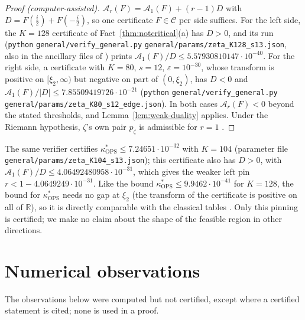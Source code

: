 \documentclass[11pt]{amsart}
\newcommand{\RR}{\mathbb R}
\newcommand{\eps}{\varepsilon}
\newcommand{\xin}[1]{\xi_{#1}}
\newcommand{\Arch}{\mathcal A}
\newcommand{\Cone}{\mathcal C}
\newcommand{\kOPS}{\kappa^{*}_{\mathrm{OPS}}}
\newcommand{\pz}{p_\zeta}
\theoremstyle{definition}
\theoremstyle{remark}
\numberwithin{equation}{section}
\begin{document}
\begin{proof}[Proof \textup{(computer-assisted)}]
$\Arch_r(F)=\Arch_1(F)+(r-1)D$ with $D=F(\frac i2)+F(-\frac i2)$, so one certificate $F\in\Cone$ per side suffices. For the left
side, the $K=128$ certificate of Fact~\ref{thm:notcritical}(a) has $D>0$, and its run (\texttt{python}
\nolinkurl{general/verify_general.py} \nolinkurl{general/params/zeta_K128_s13.json}, also in the ancillary files of \cite{PaperI}) prints
$\Arch_1(F)/D\le5.57930810147\cdot10^{-40}$. For the right side, a certificate with $K=80$, $s=12$, $\eps=10^{-30}$, whose transform is
positive on $[\xin2,\infty)$ but negative on part of $(0,\xin2)$, has $D<0$ and $\Arch_1(F)/\lvert D\rvert\le7.85509419726\cdot10^{-21}$
(\texttt{python} \nolinkurl{general/verify_general.py} \nolinkurl{general/params/zeta_K80_s12_edge.json}). In both cases $\Arch_r(F)<0$ beyond the
stated thresholds, and Lemma~\ref{lem:weak-duality} applies. Under the Riemann hypothesis, $\zeta$'s own pair $\pz$ is admissible for
$r=1$ \cite{PaperI}.
\end{proof}

The same verifier certifies $\kOPS\le7.24651\cdot10^{-32}$ with $K=104$ (parameter file
\nolinkurl{general/params/zeta_K104_s13.json}); this certificate also has $D>0$, with $\Arch_1(F)/D\le4.06492480958\cdot10^{-31}$, which
gives the weaker left pin $r<1-4.0649249\cdot10^{-31}$. Like the bound $\kOPS\le9.9462\cdot10^{-41}$ for $K=128$, the bound for
$\kOPS$ needs no gap at $\xin2$ (the transform of the certificate is positive on all of $\RR$), so it is directly comparable with
the classical tables \cite[Table~4]{Odl90}. Only this pinning is certified; we make no claim about the shape of
the feasible region in other directions.

\section{Numerical observations}\label{sec:observations}

The observations below were computed but not certified, except where a certified statement is cited; none is used in a proof.
\end{document}
